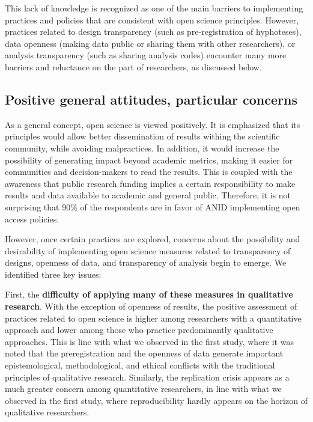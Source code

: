 \documentclass[
  english,
  letterpaper,
]{article}
\begin{document}
This lack of knowledge is recognized as one of the main barriers to
implementing practices and policies that are consistent with open
science principles. However, practices related to design transparency
(such as pre-registration of hyphoteses), data openness (making data
public or sharing them with other researchers), or analysis transparency
(such as sharing analysis codes) encounter many more barriers and
reluctance on the part of researchers, as discussed below.

\subsection{Positive general attitudes, particular
concerns}\label{positive-general-attitudes-particular-concerns}

As a general concept, open science is viewed positively. It is
emphasized that its principles would allow better dissemination of
results withing the scientific community, while avoiding malpractices.
In addition, it would increase the possibility of generating impact
beyond academic metrics, making it easier for communities and
decision-makers to read the results. This is coupled with the awareness
that public research funding implies a certain responsibility to make
results and data available to academic and general public. Therefore, it
is not surprising that 90\% of the respondents are in favor of ANID
implementing open access policies.

However, once certain practices are explored, concerns about the
possibility and desirability of implementing open science measures
related to transparency of designs, openness of data, and transparency
of analysis begin to emerge. We identified three key issues:

First, the \textbf{difficulty of applying many of these measures in
qualitative research}. With the exception of openness of results, the
positive assessment of practices related to open science is higher among
researchers with a quantitative approach and lower among those who
practice predominantly qualitative approaches. This is line with what we
observed in the first study, where it was noted that the preregistration
and the openness of data generate important epistemological,
methodological, and ethical conflicts with the traditional principles of
qualitative research. Similarly, the replication crisis appears as a
much greater concern among quantitative researchers, in line with what
we observed in the first study, where reproducibility hardly appears on
the horizon of qualitative researchers.
\end{document}
